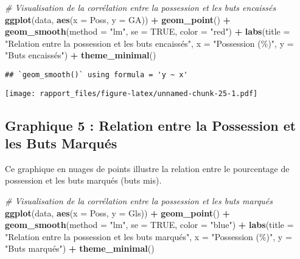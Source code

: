 \documentclass[
]{article}
\newenvironment{Shaded}{\begin{snugshade}}{\end{snugshade}}
\newcommand{\AttributeTok}[1]{\textcolor[rgb]{0.13,0.29,0.53}{#1}}
\newcommand{\CommentTok}[1]{\textcolor[rgb]{0.56,0.35,0.01}{\textit{#1}}}
\newcommand{\ConstantTok}[1]{\textcolor[rgb]{0.56,0.35,0.01}{#1}}
\newcommand{\FunctionTok}[1]{\textcolor[rgb]{0.13,0.29,0.53}{\textbf{#1}}}
\newcommand{\NormalTok}[1]{#1}
\newcommand{\SpecialCharTok}[1]{\textcolor[rgb]{0.81,0.36,0.00}{\textbf{#1}}}
\newcommand{\StringTok}[1]{\textcolor[rgb]{0.31,0.60,0.02}{#1}}
\begin{document}
\begin{Shaded}
\begin{Highlighting}[]
\CommentTok{\# Visualisation de la corrélation entre la possession et les buts encaissés}
\FunctionTok{ggplot}\NormalTok{(data, }\FunctionTok{aes}\NormalTok{(}\AttributeTok{x =}\NormalTok{ Poss, }\AttributeTok{y =}\NormalTok{ GA)) }\SpecialCharTok{+}
  \FunctionTok{geom\_point}\NormalTok{() }\SpecialCharTok{+}
  \FunctionTok{geom\_smooth}\NormalTok{(}\AttributeTok{method =} \StringTok{"lm"}\NormalTok{, }\AttributeTok{se =} \ConstantTok{TRUE}\NormalTok{, }\AttributeTok{color =} \StringTok{"red"}\NormalTok{) }\SpecialCharTok{+}
  \FunctionTok{labs}\NormalTok{(}\AttributeTok{title =} \StringTok{"Relation entre la possession et les buts encaissés"}\NormalTok{,}
       \AttributeTok{x =} \StringTok{"Possession (\%)"}\NormalTok{,}
       \AttributeTok{y =} \StringTok{"Buts encaissés"}\NormalTok{) }\SpecialCharTok{+}
  \FunctionTok{theme\_minimal}\NormalTok{()}
\end{Highlighting}
\end{Shaded}

\begin{verbatim}
## `geom_smooth()` using formula = 'y ~ x'
\end{verbatim}

\texttt{[image: rapport\_files/figure-latex/unnamed-chunk-25-1.pdf]}

\subsection{Graphique 5 : Relation entre la Possession et les Buts
Marqués}\label{graphique-5-relation-entre-la-possession-et-les-buts-marquuxe9s}

Ce graphique en nuages de points illustre la relation entre le
pourcentage de possession et les buts marqués (buts mis).

\begin{Shaded}
\begin{Highlighting}[]
\CommentTok{\# Visualisation de la corrélation entre la possession et les buts marqués}
\FunctionTok{ggplot}\NormalTok{(data, }\FunctionTok{aes}\NormalTok{(}\AttributeTok{x =}\NormalTok{ Poss, }\AttributeTok{y =}\NormalTok{ Gls)) }\SpecialCharTok{+}
  \FunctionTok{geom\_point}\NormalTok{() }\SpecialCharTok{+}
  \FunctionTok{geom\_smooth}\NormalTok{(}\AttributeTok{method =} \StringTok{"lm"}\NormalTok{, }\AttributeTok{se =} \ConstantTok{TRUE}\NormalTok{, }\AttributeTok{color =} \StringTok{"blue"}\NormalTok{) }\SpecialCharTok{+}
  \FunctionTok{labs}\NormalTok{(}\AttributeTok{title =} \StringTok{"Relation entre la possession et les buts marqués"}\NormalTok{,}
       \AttributeTok{x =} \StringTok{"Possession (\%)"}\NormalTok{,}
       \AttributeTok{y =} \StringTok{"Buts marqués"}\NormalTok{) }\SpecialCharTok{+}
  \FunctionTok{theme\_minimal}\NormalTok{()}
\end{Highlighting}
\end{Shaded}
\end{document}
